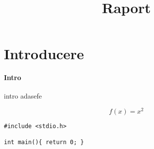 \documentclass[11pt]{article}
\title{Raport}
\begin{document}
\maketitle
\newpage
{}

\section{Introducere}
\paragraph{Intro} intro adasefe

\begin{equation}
	f(x) = x^2
\end{equation}



\begin{lstlisting}
#include <stdio.h>

int main(){ return 0; }
\end{lstlisting}
\end{document}
